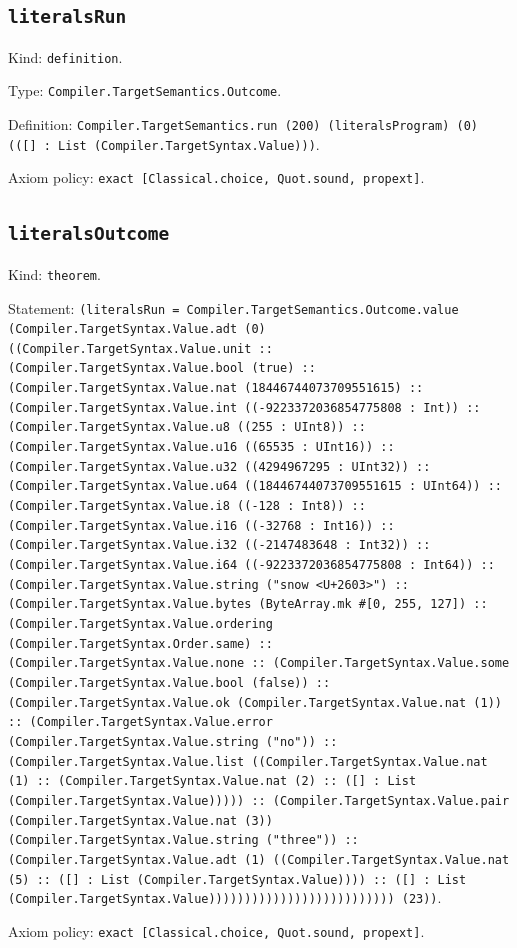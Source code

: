 \documentclass[11pt]{article}
\begin{document}
\subsection*{\texttt{literalsRun}}
\noindent Kind: \texttt{definition}.\par
\noindent Type: \texttt{Compiler.TargetSemantics.Outcome}.\par
\noindent Definition: \texttt{Compiler.TargetSemantics.run (200) (literalsProgram) (0) (([] : List (Compiler.TargetSyntax.Value)))}.\par
\noindent Axiom policy: \texttt{exact [Classical.choice, Quot.sound, propext]}.\par
\subsection*{\texttt{literalsOutcome}}
\noindent Kind: \texttt{theorem}.\par
\noindent Statement: \texttt{(literalsRun = Compiler.TargetSemantics.Outcome.value (Compiler.TargetSyntax.Value.adt (0) ((Compiler.TargetSyntax.Value.unit :: (Compiler.TargetSyntax.Value.bool (true) :: (Compiler.TargetSyntax.Value.nat (18446744073709551615) :: (Compiler.TargetSyntax.Value.int ((-9223372036854775808 : Int)) :: (Compiler.TargetSyntax.Value.u8 ((255 : UInt8)) :: (Compiler.TargetSyntax.Value.u16 ((65535 : UInt16)) :: (Compiler.TargetSyntax.Value.u32 ((4294967295 : UInt32)) :: (Compiler.TargetSyntax.Value.u64 ((18446744073709551615 : UInt64)) :: (Compiler.TargetSyntax.Value.i8 ((-128 : Int8)) :: (Compiler.TargetSyntax.Value.i16 ((-32768 : Int16)) :: (Compiler.TargetSyntax.Value.i32 ((-2147483648 : Int32)) :: (Compiler.TargetSyntax.Value.i64 ((-9223372036854775808 : Int64)) :: (Compiler.TargetSyntax.Value.string ("snow <U+2603>") :: (Compiler.TargetSyntax.Value.bytes (ByteArray.mk \#[0, 255, 127]) :: (Compiler.TargetSyntax.Value.ordering (Compiler.TargetSyntax.Order.same) :: (Compiler.TargetSyntax.Value.none :: (Compiler.TargetSyntax.Value.some (Compiler.TargetSyntax.Value.bool (false)) :: (Compiler.TargetSyntax.Value.ok (Compiler.TargetSyntax.Value.nat (1)) :: (Compiler.TargetSyntax.Value.error (Compiler.TargetSyntax.Value.string ("no")) :: (Compiler.TargetSyntax.Value.list ((Compiler.TargetSyntax.Value.nat (1) :: (Compiler.TargetSyntax.Value.nat (2) :: ([] : List (Compiler.TargetSyntax.Value))))) :: (Compiler.TargetSyntax.Value.pair (Compiler.TargetSyntax.Value.nat (3)) (Compiler.TargetSyntax.Value.string ("three")) :: (Compiler.TargetSyntax.Value.adt (1) ((Compiler.TargetSyntax.Value.nat (5) :: ([] : List (Compiler.TargetSyntax.Value)))) :: ([] : List (Compiler.TargetSyntax.Value)))))))))))))))))))))))))) (23))}.\par
\noindent Axiom policy: \texttt{exact [Classical.choice, Quot.sound, propext]}.\par
\end{document}
